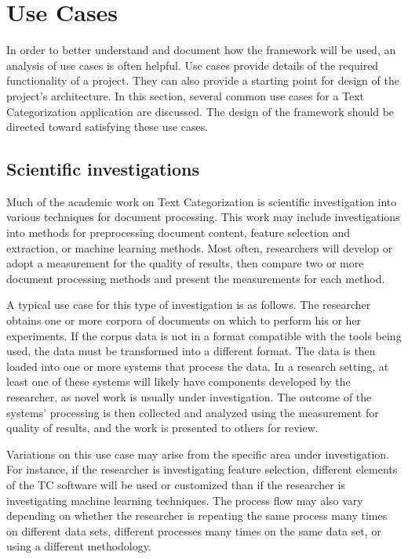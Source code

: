 \section{Use Cases}
\label{use-cases}

In order to better understand and document how the framework will be
used, an analysis of use cases is often
helpful. \cite[ch. 2]{booch:98} Use cases provide details of
the required functionality of a project.  They can also provide a
starting point for design of the project's architecture.  In this
section, several common use cases for a Text Categorization
application are discussed.  The design of the framework should be
directed toward satisfying these use cases.

\subsection{Scientific investigations}

Much of the academic work on Text Categorization is scientific
investigation into various techniques for document
processing. \cite{sebastiani:02} This work may include investigations
into methods for preprocessing document content, feature selection and
extraction, or machine learning methods.  Most often, researchers will
develop or adopt a measurement for the quality of results, then
compare two or more document processing methods and present the
measurements for each method.

A typical use case for this type of investigation is as follows.  The
researcher obtains one or more corpora of documents on which to
perform his or her experiments.  If the corpus data is not in a format
compatible with the tools being used, the data must be transformed
into a different format.  The data is then loaded into one or more
systems that process the data.  In a research setting, at least one of
these systems will likely have components developed by the researcher,
as novel work is usually under investigation.  The outcome of the
systems' processing is then collected and analyzed using the
measurement for quality of results, and the work is presented to
others for review.

Variations on this use case may arise from the specific area under
investigation.  For instance, if the researcher is investigating
feature selection, different elements of the TC software will be used
or customized than if the researcher is investigating machine learning
techniques.  The process flow may also vary depending on whether the
researcher is repeating the same process many times on different data
sets, different processes many times on the same data set, or using a
different methodology.

